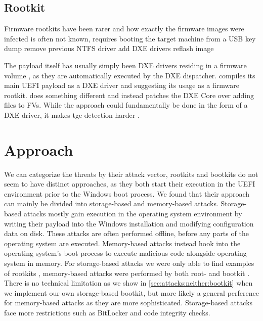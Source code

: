 \subsection{Rootkit}


Firmware rootkits have been rarer and how exactly the firmware images were infected is often not known,
\cite{vector-edk} requires booting the target machine from a USB key \cite{mosaicregressor}
 \cite{lojax}
dump
remove previous NTFS driver
add DXE drivers
reflash image

The payload itself has usually simply been \ac{DXE} drivers residing in a firmware volume \cite{mosaicregressor, lojax}, as they are automatically executed by the \ac{DXE} dispatcher. \cite{efiguard} compiles its main \ac{UEFI} payload as a \ac{DXE} driver and suggesting its usage as a firmware rootkit. \cite{moonbounce} does something different and instead patches the \ac{DXE} Core over adding files to \acp{FV}. While the approach could fundamentally be done in the form of a \ac{DXE} driver, it makes tge detection harder \cite{moonbounce}.

\section{Approach}

We can categorize the threats by their attack vector, rootkits and bootkits do not seem to have distinct approaches, as they both start their execution in the \ac{UEFI} environment prior to the Windows boot process. We found that their approach can mainly be divided into storage-based and memory-based attacks. Storage-based attacks mostly gain execution in the operating system  environment by writing their payload into the Windows installation and modifying configuration data on disk. These attacks are often performed offline, before any parts of the operating system are executed. Memory-based attacks instead hook into the operating system's boot process to execute malicious code alongside operating system in memory. For storage-based attacks we were only able to find examples of rootkits \cite{vector-edk, mosaicregressor, lojax}, memory-based attacks were performed by both root- and bootkit \cite{dreamboot, efiguard, especter, finspy ,moonbounce, cosmicstrand}. There is no technical limitation as we show in \autoref{sec:attacks:neither:bootkit} when we implement our own storage-based bootkit, but more likely a general perference for memory-based attacks as they are more sophisticated. Storage-based attacks face more restrictions such as BitLocker and code integrity checks.


